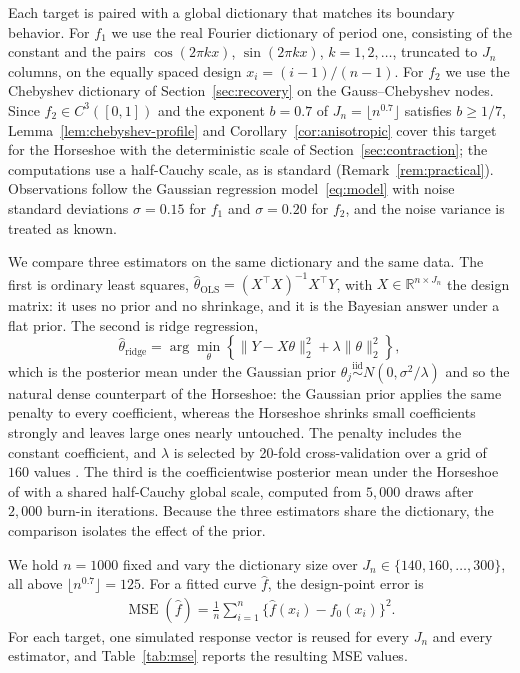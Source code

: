 Each target is paired with a global dictionary that matches its boundary behavior. For $f_1$ we use the real Fourier dictionary of period one, consisting of the constant and the pairs $\cos(2\pi kx)$, $\sin(2\pi kx)$, $k=1,2,\ldots$, truncated to $J_n$ columns, on the equally spaced design $x_i=(i-1)/(n-1)$. For $f_2$ we use the Chebyshev dictionary of Section~\ref{sec:recovery} on the Gauss--Chebyshev nodes. Since $f_2\in C^3([0,1])$ and the exponent $b=0.7$ of $J_n=\lfloor n^{0.7}\rfloor$ satisfies $b\geq1/7$, Lemma~\ref{lem:chebyshev-profile} and Corollary~\ref{cor:anisotropic} cover this target for the Horseshoe with the deterministic scale of Section~\ref{sec:contraction}; the computations use a half-Cauchy scale, as is standard (Remark~\ref{rem:practical}). Observations follow the Gaussian regression model~\eqref{eq:model} with noise standard deviations $\sigma=0.15$ for $f_1$ and $\sigma=0.20$ for $f_2$, and the noise variance is treated as known.

We compare three estimators on the same dictionary and the same data. The first is ordinary least squares, $\widehat\theta_{\mathrm{OLS}}=(X^\top X)^{-1}X^\top Y$, with $X\in\mathbb{R}^{n\times J_n}$ the design matrix: it uses no prior and no shrinkage, and it is the Bayesian answer under a flat prior. The second is ridge regression,
\[
\widehat\theta_{\mathrm{ridge}}
=\arg\min_{\theta}\left\{\|Y-X\theta\|_2^2+\lambda\|\theta\|_2^2\right\},
\]
which is the posterior mean under the Gaussian prior $\theta_j\overset{\mathrm{iid}}{\sim}N(0,\sigma^2/\lambda)$ and so the natural dense counterpart of the Horseshoe: the Gaussian prior applies the same penalty to every coefficient, whereas the Horseshoe shrinks small coefficients strongly and leaves large ones nearly untouched. The penalty includes the constant coefficient, and $\lambda$ is selected by 20-fold cross-validation over a grid of $160$ values \citep{Arlot2010,Krstajic2014}. The third is the coefficientwise posterior mean under the Horseshoe of \citet{Carvalho2009} with a shared half-Cauchy global scale, computed from $5{,}000$ draws after $2{,}000$ burn-in iterations. Because the three estimators share the dictionary, the comparison isolates the effect of the prior.

We hold $n=1000$ fixed and vary the dictionary size over $J_n\in\{140,160,\ldots,300\}$, all above $\lfloor n^{0.7}\rfloor=125$. For a fitted curve $\widehat f$, the design-point error is
\begin{align*}
\operatorname{MSE}(\widehat f)
=\frac1n\sum_{i=1}^n\{\widehat f(x_i)-f_0(x_i)\}^2.
\end{align*}
For each target, one simulated response vector is reused for every $J_n$ and every estimator, and Table~\ref{tab:mse} reports the resulting MSE values.

